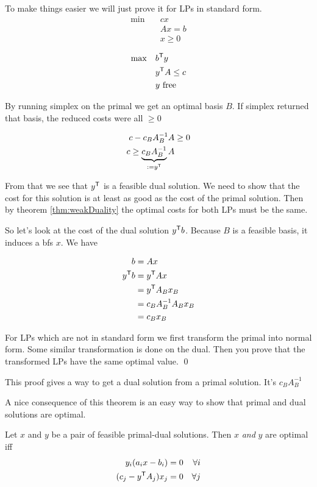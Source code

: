 \begin{pr} To make things easier we will just prove it for LPs in standard form.
\begin{align*}
\min \quad & cx\\
& Ax = b\\
&x\geq 0
\end{align*}

\begin{align*}
\max \quad &{b}^\text{\upshape \sffamily T}y\\
& {y}^\text{\upshape \sffamily T}A \leq c\\
& y \text{ free}
\end{align*}

By running simplex on the primal we get an optimal basis $B$. If simplex returned that basis, the reduced costs were all $\geq 0$

\begin{align*}
c-c_BA_B^{-1}A &\geq 0\\
c \geq \underbrace{c_BA_B^{-1}}_{:={y}^\text{\upshape \sffamily T}}A
\end{align*}

From that we see that ${y}^\text{\upshape \sffamily T}$ is a feasible dual solution. We need to show that the cost for this solution is at least as good as the cost of the primal solution. Then by theorem \ref{thm:weakDuality} the optimal costs for both LPs must be the same.

So let's look at the cost of the dual solution ${y}^\text{\upshape \sffamily T} b$. Because $B$ is a feasible basis, it induces a bfs $x$. We have

\begin{align*}
b &= Ax\\
{y}^\text{\upshape \sffamily T} b &= {y}^\text{\upshape \sffamily T} A x\\
 &={y}^\text{\upshape \sffamily T} A_B x_B\\
 &=c_B A_B^{-1}A_B x_B\\
 &=c_B x_B
 \end{align*}
 
 For LPs which are not in standard form we first transform the primal into normal form. Some similar transformation is done on the dual. Then you prove that the transformed LPs have the same optimal value.
\qed \end{pr}

This proof gives a way to get a dual solution from a primal solution. It's $c_BA_B^{-1}$

A nice consequence of this theorem is an easy way to show that primal and dual solutions are optimal.

\begin{thm}\label{thm:complSlackness} Let $x$ and $y$ be a pair of feasible primal-dual solutions. Then $x$ \emph{and} $y$ are optimal iff
\begin{align*}
y_i(a_ix-b_i) = 0 && \forall i\\ 
(c_j - {y}^\text{\upshape \sffamily T}A_j)x_j =0 && \forall j
\end{align*}
\end{thm}

